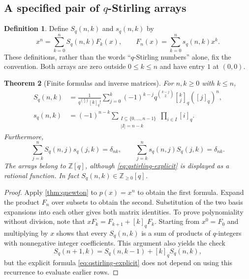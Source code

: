 \documentclass[11pt,a4paper]{article}
\numberwithin{equation}{section}
\newtheorem{theorem}{Theorem}[section]
\theoremstyle{definition}
\newtheorem{definition}[theorem]{Definition}
\theoremstyle{remark}
\newcommand{\Z}{\mathbb Z}
\newcommand{\qb}[2]{\genfrac{[}{]}{0pt}{}{#1}{#2}_{q}}
\newcommand{\qf}[1]{[#1]_{q}!}
\newcommand{\qi}[1]{[#1]_{q}}
\begin{document}
\subsection{A specified pair of \texorpdfstring{$q$}{q}-Stirling arrays}
\begin{definition}\label{def:qstirling}
Define $S_q(n,k)$ and $s_q(n,k)$ by
\begin{equation}\label{eq:qstirling-def}
 x^n=\sum_{k=0}^nS_q(n,k)F_k(x),\qquad
 F_n(x)=\sum_{k=0}^n s_q(n,k)x^k.
\end{equation}
These definitions, rather than the words ``$q$-Stirling numbers'' alone, fix the
convention. Both arrays are zero outside $0\le k\le n$ and have entry $1$ at
$(0,0)$.
\end{definition}

\begin{theorem}[Finite formulas and inverse matrices]\label{thm:qstirling}
For $n,k\ge0$ with $k\le n$,
\begin{align}
 S_q(n,k)
 &=\frac1{q^{\binom k2}\qf k}
   \sum_{j=0}^k(-1)^{k-j}q^{\binom{k-j}2}\qb kj(\qi j)^n,
 \label{eq:qstirling-explicit}\\
 s_q(n,k)
 &=(-1)^{n-k}
   \sum_{\substack{I\subseteq\{0,\ldots,n-1\}\\|I|=n-k}}
         \prod_{i\in I}\qi i.\label{eq:qstirling-first}
\end{align}
Furthermore,
\begin{equation}\label{eq:qstirling-inverse}
 \sum_{j=k}^nS_q(n,j)s_q(j,k)=\delta_{nk},\qquad
 \sum_{j=k}^ns_q(n,j)S_q(j,k)=\delta_{nk}.
\end{equation}
The arrays belong to $\Z[q]$, although \eqref{eq:qstirling-explicit} is displayed
as a rational function. In fact $S_q(n,k)\in\Z_{\ge0}[q]$.
\end{theorem}
\begin{proof}
Apply \cref{thm:qnewton} to $p(x)=x^n$ to obtain the first formula. Expand the
product $F_n$ over subsets to obtain the second. Substitution of the two basis
expansions into each other gives both matrix identities.
To prove polynomiality without division, note that
$xF_k=F_{k+1}+\qi k F_k$. Starting from $x^0=F_0$ and multiplying by $x$
shows that every $S_q(n,k)$ is a sum of products of $q$-integers with nonnegative
integer coefficients. This argument also yields the check
\[
 S_q(n+1,k)=S_q(n,k-1)+\qi k S_q(n,k),
\]
but the explicit formula \eqref{eq:qstirling-explicit} does not depend on using
this recurrence to evaluate earlier rows.
\end{proof}
\end{document}
